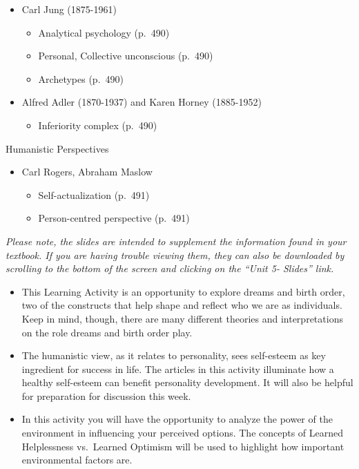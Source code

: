 \documentclass[
]{book}
\providecommand{\tightlist}{%
  \setlength{\itemsep}{0pt}\setlength{\parskip}{0pt}}
\begin{document}
\begin{reflect}
\begin{itemize}
\tightlist
\item
  Carl Jung (1875-1961)

  \begin{itemize}
  \tightlist
  \item
    Analytical psychology (p.~490)\\
  \item
    Personal, Collective unconscious (p.~490)\\
  \item
    Archetypes (p.~490)\\
  \end{itemize}
\item
  Alfred Adler (1870-1937) and Karen Horney (1885-1952)

  \begin{itemize}
  \tightlist
  \item
    Inferiority complex (p.~490)
  \end{itemize}
\end{itemize}

Humanistic Perspectives

\begin{itemize}
\tightlist
\item
  Carl Rogers, Abraham Maslow

  \begin{itemize}
  \tightlist
  \item
    Self-actualization (p.~491)\\
  \item
    Person-centred perspective (p.~491)
  \end{itemize}
\end{itemize}

\emph{Please note, the slides are intended to supplement the information found in your textbook. If you are having trouble viewing them, they can also be downloaded by scrolling to the bottom of the screen and clicking on the ``Unit 5- Slides'' link.}

\begin{itemize}
\tightlist
\item
  This Learning Activity is an opportunity to explore dreams and birth order, two of the constructs that help shape and reflect who we are as individuals. Keep in mind, though, there are many different theories and interpretations on the role dreams and birth order play.\\
\item
  The humanistic view, as it relates to personality, sees self-esteem as key ingredient for success in life. The articles in this activity illuminate how a healthy self-esteem can benefit personality development. It will also be helpful for preparation for discussion this week.\\
\item
  In this activity you will have the opportunity to analyze the power of the environment in influencing your perceived options. The concepts of Learned Helplessness vs.~Learned Optimism will be used to highlight how important environmental factors are.
\end{itemize}


\end{reflect}
\end{document}
